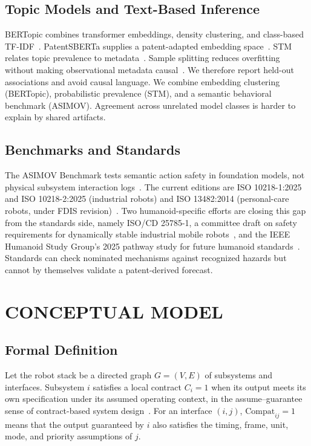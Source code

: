 \documentclass[letterpaper,9pt,conference]{ieeeconf}
\begin{document}
\subsection{Topic Models and Text-Based Inference}

BERTopic combines transformer embeddings, density clustering, and class-based TF-IDF~\cite{grootendorst2022}. PatentSBERTa supplies a patent-adapted embedding space~\cite{bekamiri2021}. STM relates topic prevalence to metadata~\cite{roberts2019}. Sample splitting reduces overfitting without making observational metadata causal~\cite{egami2022}. We therefore report held-out associations and avoid causal language. We combine embedding clustering (BERTopic), probabilistic prevalence (STM), and a semantic behavioral benchmark (ASIMOV). Agreement across unrelated model classes is harder to explain by shared artifacts.

\subsection{Benchmarks and Standards}

The ASIMOV Benchmark tests semantic action safety in foundation models, not physical subsystem interaction logs~\cite{sermanet2025}. The current editions are ISO 10218-1:2025 and ISO 10218-2:2025 (industrial robots) and ISO 13482:2014 (personal-care robots, under FDIS revision)~\cite{iso10218_1,iso10218_2,iso13482_2014,iso13482_fdis}. Two humanoid-specific efforts are closing this gap from the standards side, namely ISO/CD 25785-1, a committee draft on safety requirements for dynamically stable industrial mobile robots~\cite{iso25785_1}, and the IEEE Humanoid Study Group's 2025 pathway study for future humanoid standards~\cite{ieeehsg2025}. Standards can check nominated mechanisms against recognized hazards but cannot by themselves validate a patent-derived forecast.

\section{CONCEPTUAL MODEL}

\subsection{Formal Definition}

Let the robot stack be a directed graph $G = (V,E)$ of subsystems and interfaces. Subsystem $i$ satisfies a local contract $C_{i} = 1$ when its output meets its own specification under its assumed operating context, in the assume--guarantee sense of contract-based system design~\cite{benveniste2018}. For an interface $(i,j)$, $\mathrm{Compat}_{ij} = 1$ means that the output guaranteed by $i$ also satisfies the timing, frame, unit, mode, and priority assumptions of $j$.
\end{document}
